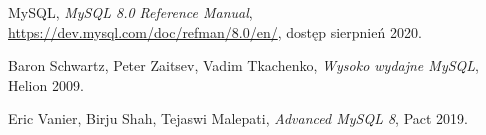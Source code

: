 \begin{thebibliography}{}
	
	 MySQL, \emph{MySQL 8.0 Reference Manual}, \url{https://dev.mysql.com/doc/refman/8.0/en/}, dostęp sierpnień 2020.
	
	 Baron Schwartz, Peter Zaitsev, Vadim Tkachenko,  \emph{Wysoko wydajne MySQL}, Helion 2009.
	
	 Eric Vanier, Birju Shah, Tejaswi Malepati,  \emph{Advanced MySQL 8}, Pact 2019.
	
	
	
\end{thebibliography}